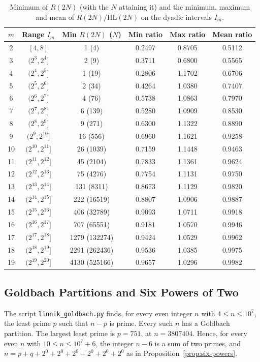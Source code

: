 \documentclass[11pt]{amsart}
\theoremstyle{definition}
\theoremstyle{remark}
\begin{document}
\begin{table}[H]
\caption{Minimum of $R(2N)$ (with the $N$ attaining it) and the minimum, maximum and mean of $R(2N)/\mathrm{HL}(2N)$ on the dyadic intervals $I_m$.}
\label{tab:hl}
\footnotesize
\setlength{\tabcolsep}{4pt}
\begin{tabularx}{\textwidth}{cccccc}
\hline
\textbf{$m$} & \textbf{Range $I_m$} & \textbf{Min $R(2N)$ ($N$)} & \textbf{Min ratio} & \textbf{Max ratio} & \textbf{Mean ratio} \\
\hline
2 & $[4,8]$ & 1 (4) & 0.2497 & 0.8705 & 0.5112 \\
3 & $(2^{3},2^{4}]$ & 2 (9) & 0.3711 & 0.6800 & 0.5565 \\
4 & $(2^{4},2^{5}]$ & 1 (19) & 0.2806 & 1.1702 & 0.6706 \\
5 & $(2^{5},2^{6}]$ & 2 (34) & 0.4264 & 1.0380 & 0.7407 \\
6 & $(2^{6},2^{7}]$ & 4 (76) & 0.5738 & 1.0863 & 0.7970 \\
7 & $(2^{7},2^{8}]$ & 6 (139) & 0.5280 & 1.0909 & 0.8530 \\
8 & $(2^{8},2^{9}]$ & 9 (271) & 0.6300 & 1.1322 & 0.8890 \\
9 & $(2^{9},2^{10}]$ & 16 (556) & 0.6960 & 1.1621 & 0.9258 \\
10 & $(2^{10},2^{11}]$ & 26 (1039) & 0.7159 & 1.1448 & 0.9463 \\
11 & $(2^{11},2^{12}]$ & 45 (2104) & 0.7833 & 1.1361 & 0.9624 \\
12 & $(2^{12},2^{13}]$ & 75 (4276) & 0.7754 & 1.1131 & 0.9750 \\
13 & $(2^{13},2^{14}]$ & 131 (8311) & 0.8673 & 1.1129 & 0.9820 \\
14 & $(2^{14},2^{15}]$ & 222 (16519) & 0.8807 & 1.0906 & 0.9887 \\
15 & $(2^{15},2^{16}]$ & 406 (32789) & 0.9093 & 1.0711 & 0.9918 \\
16 & $(2^{16},2^{17}]$ & 707 (65551) & 0.9181 & 1.0570 & 0.9946 \\
17 & $(2^{17},2^{18}]$ & 1279 (132274) & 0.9424 & 1.0529 & 0.9962 \\
18 & $(2^{18},2^{19}]$ & 2291 (262436) & 0.9536 & 1.0385 & 0.9975 \\
19 & $(2^{19},2^{20}]$ & 4130 (525166) & 0.9657 & 1.0296 & 0.9982 \\
\hline
\end{tabularx}
\end{table}

\subsection{Goldbach Partitions and Six Powers of Two}\label{subsec:linnik-data}
The script \texttt{linnik\_goldbach.py} finds, for every even integer $n$ with $4\leq n\leq 10^7$, the least prime $p$ such that $n-p$ is prime. Every such $n$ has a Goldbach partition. The largest least prime is $p=751$, at $n=3807404$. Hence, for every even $n$ with $10\leq n\leq 10^7+6$, the integer $n-6$ is a sum of two primes, and $n=p+q+2^0+2^0+2^0+2^0+2^0+2^0$ as in Proposition~\ref{prop:six-powers}.
\end{document}
